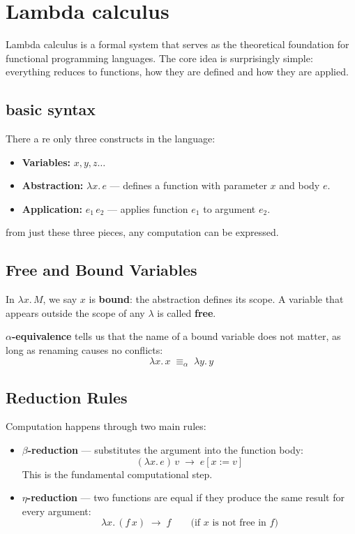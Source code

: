 \section{Lambda calculus}
Lambda calculus is a formal system that serves as the theoretical foundation for functional programming languages. The core idea is surprisingly simple: everything reduces to functions, how they are defined and how they are applied.

\subsection{basic syntax} 
There a re only three constructs in the language:


\begin{itemize}
    \item \textbf{Variables:} $x, y, z \dots$
    \item \textbf{Abstraction:} $\lambda x.\, e$ — defines a function with
    parameter $x$ and body $e$.
    \item \textbf{Application:} $e_1\, e_2$ — applies function $e_1$ to
    argument $e_2$.
\end{itemize}

from just these three pieces, any computation can be expressed.


\subsection{Free and Bound Variables}
In $\lambda x.\, M$, we say $x$ is \textbf{bound}: the abstraction defines
its scope. A variable that appears outside the scope of any $\lambda$ is
called \textbf{free}.

\textbf{$\alpha$-equivalence} tells us that the name of a bound variable
does not matter, as long as renaming causes no conflicts:
\[
  \lambda x.\, x \;\equiv_\alpha\; \lambda y.\, y
\]

\subsection{Reduction Rules}
Computation happens through two main rules:
\begin{itemize}
    \item \textbf{$\beta$-reduction} — substitutes the argument into the
    function body:
    \[(\lambda x.\, e)\, v \;\to\; e[x := v]\]
    This is the fundamental computational step.

    \item \textbf{$\eta$-reduction} — two functions are equal if they produce
    the same result for every argument:
    \[\lambda x.\, (f\, x) \;\to\; f \qquad \text{(if $x$ is not free in
    $f$)}\]
\end{itemize}

